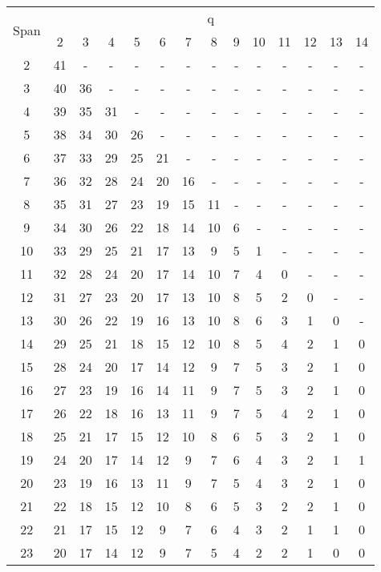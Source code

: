 \documentclass[paper=a4, fontsize=11pt]{scrartcl} %
\numberwithin{equation}{section} %
\numberwithin{figure}{section} %
\numberwithin{table}{section} %
\begin{document}
\begin{table}[H]
\centering
\begin{tabular} {|c|c|c|c|c|c|c|c|c|c|c|c|c|c|}
	\hline
	\multirow{ 2}{*}{Span} & \multicolumn{13}{|c|}{q} \\ 
	  & 2 &	3 & 4 &	5 & 6 & 7 & 8 & 9 &	10 & 11 & 12 & 13 & 14 \\ \hline
	2 & 41 & - & - & - & - & - & - & - & - & - & - & - & - \\
	3 & 40 & 36 & - & - & - & - & - & - & - & - & - & - & - \\
	4 & 39 & 35 & 31 & - & - & - & - & - & - & - & - & - & - \\
	5 & 38 & 34 & 30 & 26 & - & - & - & - & - & - & - & - & - \\
	6 & 37 & 33 & 29 & 25 & 21 & - & - & - & - & - & - & - & - \\
	7 & 36 & 32 & 28 & 24 & 20 & 16 & - & - & - & - & - & - & - \\
	8 & 35 & 31 & 27 & 23 & 19 & 15 & 11 & - & - & - & - & - & - \\
	9 & 34 & 30 & 26 & 22 & 18 & 14 & 10 & 6 & - & - & - & - & - \\
	10 & 33 & 29 & 25 & 21 & 17 & 13 & 9 & 5 & 1 & - & - & - & - \\
	11 & 32 & 28 & 24 & 20 & 17 & 14 & 10 & 7 & 4 & 0 & - & - & - \\
	12 & 31 & 27 & 23 & 20 & 17 & 13 & 10 & 8 & 5 & 2 & 0 & - & - \\
	13 & 30 & 26 & 22 & 19 & 16 & 13 & 10 & 8 & 6 & 3 & 1 & 0 & - \\
	14 & 29 & 25 & 21 & 18 & 15 & 12 & 10 & 8 & 5 & 4 & 2 & 1 & 0 \\
	15 & 28 & 24 & 20 & 17 & 14 & 12 & 9 & 7 & 5 & 3 & 2 & 1 & 0 \\
	16 & 27 & 23 & 19 & 16 & 14 & 11 & 9 & 7 & 5 & 3 & 2 & 1 & 0 \\
	17 & 26 & 22 & 18 & 16 & 13 & 11 & 9 & 7 & 5 & 4 & 2 & 1 & 0 \\
	18 & 25 & 21 & 17 & 15 & 12 & 10 & 8 & 6 & 5 & 3 & 2 & 1 & 0 \\
	19 & 24 & 20 & 17 & 14 & 12 & 9 & 7 & 6 & 4 & 3 & 2 & 1 & 1 \\
	20 & 23 & 19 & 16 & 13 & 11 & 9 & 7 & 5 & 4 & 3 & 2 & 1 & 0 \\
	21 & 22 & 18 & 15 & 12 & 10 & 8 & 6 & 5 & 3 & 2 & 2 & 1 & 0 \\
	22 & 21 & 17 & 15 & 12 & 9 & 7 & 6 & 4 & 3 & 2 & 1 & 1 & 0 \\
	23 & 20 & 17 & 14 & 12 & 9 & 7 & 5 & 4 & 2 & 2 & 1 & 0 & 0 \\

\end{tabular}
\end{table}
\end{document}
